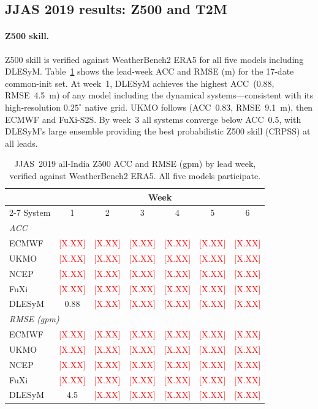 \documentclass[11pt,a4paper]{article}
\newcommand{\phnum}{\textcolor{red}{[X.XX]}}
\begin{document}
\subsection{JJAS 2019 results: Z500 and T2M}\label{sec:jjas_z500}

\paragraph{Z500 skill.}
Z500 skill is verified against WeatherBench2 ERA5 for all five models including
DLESyM. Table~\ref{tab:jjas_acc_z500} shows the lead-week ACC and RMSE (m) for
the 17-date common-init set. At week~1, DLESyM achieves the highest ACC~(0.88,
RMSE~4.5~m) of any model including the dynamical systems---consistent with its
high-resolution $0.25^\circ$ native grid. UKMO follows (ACC~0.83, RMSE~9.1~m),
then ECMWF and FuXi-S2S. By week~3 all systems converge below ACC~0.5, with
DLESyM's large ensemble providing the best probabilistic Z500 skill (CRPSS) at
all leads.

\begin{table}[t]
  \caption{JJAS~2019 all-India Z500 ACC and RMSE (gpm) by lead week, verified
  against WeatherBench2 ERA5. All five models participate.}
  \label{tab:jjas_acc_z500}
  \centering
  \small
  \begin{tabular}{lcccccc}
    \toprule
    & \multicolumn{6}{c}{Week} \\
    \cmidrule(lr){2-7}
    System & 1 & 2 & 3 & 4 & 5 & 6 \\
    \midrule
    \multicolumn{7}{l}{\textit{ACC}} \\
    ECMWF   & \phnum & \phnum & \phnum & \phnum & \phnum & \phnum \\
    UKMO    & \phnum & \phnum & \phnum & \phnum & \phnum & \phnum \\
    NCEP    & \phnum & \phnum & \phnum & \phnum & \phnum & \phnum \\
    FuXi    & \phnum & \phnum & \phnum & \phnum & \phnum & \phnum \\
    DLESyM  & 0.88   & \phnum & \phnum & \phnum & \phnum & \phnum \\
    \midrule
    \multicolumn{7}{l}{\textit{RMSE (gpm)}} \\
    ECMWF   & \phnum & \phnum & \phnum & \phnum & \phnum & \phnum \\
    UKMO    & \phnum & \phnum & \phnum & \phnum & \phnum & \phnum \\
    NCEP    & \phnum & \phnum & \phnum & \phnum & \phnum & \phnum \\
    FuXi    & \phnum & \phnum & \phnum & \phnum & \phnum & \phnum \\
    DLESyM  & 4.5    & \phnum & \phnum & \phnum & \phnum & \phnum \\
    \bottomrule
  \end{tabular}
\end{table}
\end{document}
